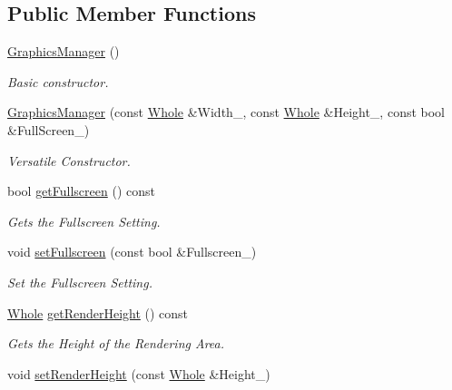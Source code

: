 \subsection*{Public Member Functions}
\begin{DoxyCompactItemize}
\item 
\hyperlink{classphys_1_1GraphicsManager_aceab258136ec2f29c8f163bf270f62c1}{GraphicsManager} ()
\begin{DoxyCompactList}\small\item\em Basic constructor. \item\end{DoxyCompactList}\item 
\hyperlink{classphys_1_1GraphicsManager_af9ac5e5f56e5eb2f94c16d594e70123b}{GraphicsManager} (const \hyperlink{namespacephys_a460f6bc24c8dd347b05e0366ae34f34a}{Whole} \&Width\_\-, const \hyperlink{namespacephys_a460f6bc24c8dd347b05e0366ae34f34a}{Whole} \&Height\_\-, const bool \&FullScreen\_\-)
\begin{DoxyCompactList}\small\item\em Versatile Constructor. \item\end{DoxyCompactList}\item 
bool \hyperlink{classphys_1_1GraphicsManager_ad126eedb81e3f0304731ddd33b617593}{getFullscreen} () const 
\begin{DoxyCompactList}\small\item\em Gets the Fullscreen Setting. \item\end{DoxyCompactList}\item 
void \hyperlink{classphys_1_1GraphicsManager_aafcf1824190e44d42a9bfbea9cfbe1b2}{setFullscreen} (const bool \&Fullscreen\_\-)
\begin{DoxyCompactList}\small\item\em Set the Fullscreen Setting. \item\end{DoxyCompactList}\item 
\hyperlink{namespacephys_a460f6bc24c8dd347b05e0366ae34f34a}{Whole} \hyperlink{classphys_1_1GraphicsManager_a38ee0f8a8a7d8ba861b1c6cfe579443e}{getRenderHeight} () const 
\begin{DoxyCompactList}\small\item\em Gets the Height of the Rendering Area. \item\end{DoxyCompactList}\item 
void \hyperlink{classphys_1_1GraphicsManager_a8d59e9a8aa2ae7f520d388a4c70f0623}{setRenderHeight} (const \hyperlink{namespacephys_a460f6bc24c8dd347b05e0366ae34f34a}{Whole} \&Height\_\-)

\end{DoxyCompactItemize}
